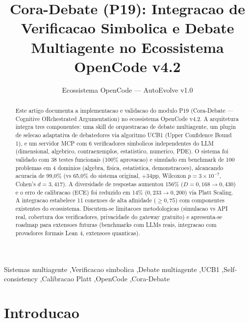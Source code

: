\documentclass[5p]{elsarticle}
\begin{document}
\begin{frontmatter}
\title{Cora-Debate (P19): Integracao de Verificacao Simbolica e Debate Multiagente no Ecossistema OpenCode v4.2}
\author[ufc]{Ecossistema OpenCode --- AutoEvolve v1.0}
\address[ufc]{PPGTE/CT/UFC --- Universidade Federal do Ceara, Fortaleza, CE, Brasil}

\begin{abstract}
Este artigo documenta a implementacao e validacao do modulo P19 (Cora-Debate --- Cognitive ORchestrated Argumentation) no ecossistema OpenCode v4.2. A arquitetura integra tres componentes: uma skill de orquestracao de debate multiagente, um plugin de selecao adaptativa de debatedores via algoritmo UCB1 (Upper Confidence Bound 1), e um servidor MCP com 6 verificadores simbolicos independentes do LLM (dimensional, algebrico, contraexemplos, estatistico, numerico, PDE). O sistema foi validado com 38 testes funcionais (100\% aprovacao) e simulado em benchmark de 100 problemas em 4 dominios (algebra, fisica, estatistica, demonstracoes), alcancando acuracia de 99,0\% (vs 65,0\% do sistema original, +34pp, Wilcoxon $p = 3 \times 10^{-7}$, Cohen's $d = 3,417$). A diversidade de respostas aumentou 156\% ($D = 0,168 \to 0,430$) e o erro de calibracao (ECE) foi reduzido em 14\% ($0,233 \to 0,200$) via Platt Scaling. A integracao estabelece 11 conexoes de alta afinidade ($\geq 0,75$) com componentes existentes do ecossistema. Discutem-se limitacoes metodologicas (simulacao vs API real, cobertura dos verificadores, privacidade do gateway gratuito) e apresenta-se roadmap para extensoes futuras (benchmarks com LLMs reais, integracao com provadores formais Lean 4, extensoes quanticas).
\end{abstract}
\begin{keyword}
Sistemas multiagente \sep Verificacao simbolica \sep Debate multiagente \sep UCB1 \sep Self-consistency \sep Calibracao Platt \sep OpenCode \sep Cora-Debate
\end{keyword}
\end{frontmatter}
\maketitle

\tableofcontents
\newpage

\section{Introducao}
\end{document}
